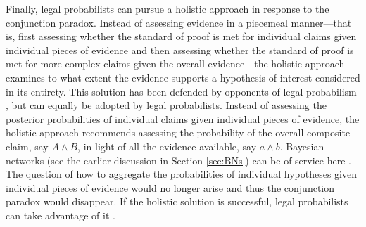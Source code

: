 \documentclass{article}
\begin{document}
 
 
 
 Finally, legal probabilists  can pursue a holistic approach in response to the conjunction paradox. Instead of assessing evidence  in a piecemeal manner---that is, first assessing whether the standard of proof is met for individual claims given individual pieces of evidence and then assessing whether the standard of proof is met for more complex claims given the overall evidence---the holistic approach   examines to what extent the evidence supports a hypothesis of interest considered in its entirety. This solution has been defended  by opponents of legal probabilism \citep{Allen1986A-Reconceptuali,AllenPardo2019relative}, but can equally be adopted by legal probabilists. 
   Instead of assessing the posterior probabilities of individual claims given individual pieces of evidence, the holistic approach recommends assessing the probability of the overall composite claim, say $A \wedge B$, in light of all the evidence available, say $a \wedge b$.
   Bayesian networks (see the earlier discussion in Section \ref{sec:BNs}) 
   can be of service here  \citep{dezoete2018CombiningMultiplePieces,dezoete2017CombiningForensicEvidencea,Fenton2019Modelling}. The question of how to aggregate the probabilities of individual hypotheses given individual pieces of evidence would no longer arise and thus the conjunction paradox would disappear. If the holistic solution is successful, legal probabilists can take advantage of it \citep{dibello2019TrialStatisticsHigh}. 
 
 





\end{document}
